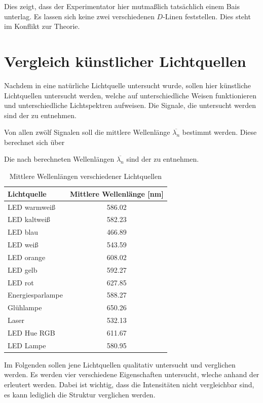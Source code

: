Dies zeigt, dass der Experimentator hier mutmaßlich tatsächlich einem Bais unterlag. Es lassen sich keine zwei verschiedenen $D$-Linen feststellen. Dies steht im Konflikt zur Theorie.


\section{Vergleich künstlicher Lichtquellen}
\label{sec:A2}
Nachdem in  eine natürliche Lichtquelle untersucht wurde, sollen hier künstliche Lichtquellen untersucht werden, welche auf unterschiedliche Weisen funktionieren und unterschiedliche Lichtspektren aufweisen. Die Signale, die untersucht werden sind der  zu entnehmen.

Von allen zwölf Signalen soll die mittlere Wellenlänge $\overline{\lambda_n}$ bestimmt werden. Diese berechnet sich über

Die nach  berechneten Wellenlängen $\overline{\lambda_n}$ sind der  zu entnehmen.
\begin{table}[h!]
    \caption{Mittlere Wellenlängen verschiedener Lichtquellen}
    \label{tab:wellenlaengen}
    \centering
    \begin{tabular}{l | c}
        \toprule
        Lichtquelle & Mittlere Wellenlänge [nm] \\
        \midrule
        LED warmweiß & 586.02 \\
        LED kaltweiß & 582.23 \\
        LED blau & 466.89 \\
        LED weiß & 543.59 \\
        LED orange & 608.02 \\
        LED gelb & 592.27 \\
        LED rot & 627.85 \\
        Energiesparlampe & 588.27 \\
        Glühlampe & 650.26 \\
        Laser & 532.13 \\
        LED Hue RGB & 611.67 \\
        LED Lampe & 580.95 \\
        \bottomrule
    \end{tabular}
\end{table}
Im Folgenden sollen jene Lichtquellen qualitativ untersucht und verglichen werden. Es werden vier verschiedene Eigenschaften untersucht, wleche anhand der  erleutert werden.
Dabei ist wichtig, dass die Intensitäten nicht vergleichbar sind, es kann lediglich die Struktur verglichen werden.

